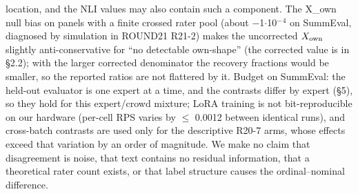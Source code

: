 \documentclass[10pt]{article}
\begin{document}
location, and the NLI values may also contain such a component. The X\_own null bias on panels with a finite crossed rater pool (about $-$1$\cdot$10$^{-}$$^{4}$ on SummEval, diagnosed by simulation in ROUND21 R21-2) makes the uncorrected \(X_{\rm own}\) slightly anti-conservative for ``no detectable own-shape'' (the corrected value is in \S{}2.2); with the larger corrected denominator the recovery fractions would be smaller, so the reported ratios are not flattered by it. Budget on SummEval: the held-out evaluator is one expert at a time, and the contrasts differ by expert (\S{}5), so they hold for this expert/crowd mixture; LoRA training is not bit-reproducible on our hardware (per-cell RPS varies by $\leq$ 0.0012 between identical runs), and cross-batch contrasts are used only for the descriptive R20-7 arms, whose effects exceed that variation by an order of magnitude. We make no claim that disagreement is noise, that text contains no residual information, that a theoretical rater count exists, or that label structure causes the ordinal--nominal difference.



\end{document}
